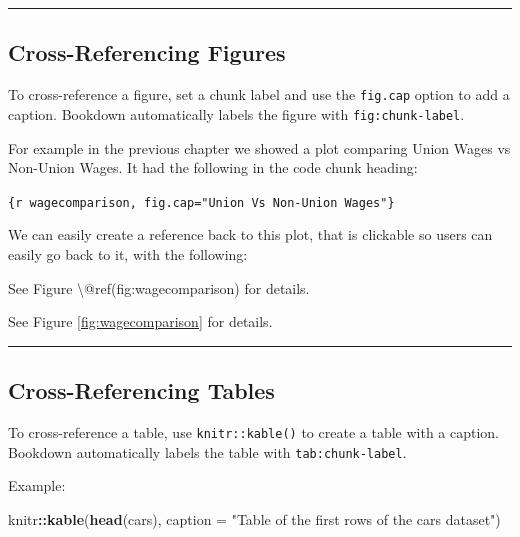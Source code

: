 \documentclass[
]{book}
\newenvironment{Shaded}{\begin{snugshade}}{\end{snugshade}}
\newcommand{\AttributeTok}[1]{\textcolor[rgb]{0.13,0.29,0.53}{#1}}
\newcommand{\FunctionTok}[1]{\textcolor[rgb]{0.13,0.29,0.53}{\textbf{#1}}}
\newcommand{\NormalTok}[1]{#1}
\newcommand{\SpecialCharTok}[1]{\textcolor[rgb]{0.81,0.36,0.00}{\textbf{#1}}}
\newcommand{\StringTok}[1]{\textcolor[rgb]{0.31,0.60,0.02}{#1}}
\theoremstyle{definition}
\theoremstyle{definition}
\theoremstyle{definition}
\theoremstyle{definition}
\theoremstyle{remark}
\begin{document}
\begin{center}\rule{0.5\linewidth}{0.5pt}\end{center}

\subsection{Cross-Referencing Figures}\label{cross-referencing-figures}

To cross-reference a figure, set a chunk label and use the \texttt{fig.cap} option to add a caption. Bookdown automatically labels the figure with \texttt{fig:chunk-label}.

For example in the previous chapter we showed a plot comparing Union Wages vs Non-Union Wages. It had the following in the code chunk heading:

\texttt{\{r\ wagecomparison,\ fig.cap="Union\ Vs\ Non-Union\ Wages"\}}

We can easily create a reference back to this plot, that is clickable so users can easily go back to it, with the following:

\begin{Shaded}
\begin{Highlighting}[]
\NormalTok{See Figure \textbackslash{}@ref(fig:wagecomparison) for details.}
\end{Highlighting}
\end{Shaded}

See Figure \ref{fig:wagecomparison} for details.

\begin{center}\rule{0.5\linewidth}{0.5pt}\end{center}

\subsection{Cross-Referencing Tables}\label{cross-referencing-tables}

To cross-reference a table, use \texttt{knitr::kable()} to create a table with a caption. Bookdown automatically labels the table with \texttt{tab:chunk-label}.

Example:

\begin{Shaded}
\begin{Highlighting}[]
\NormalTok{knitr}\SpecialCharTok{::}\FunctionTok{kable}\NormalTok{(}\FunctionTok{head}\NormalTok{(cars), }\AttributeTok{caption =} \StringTok{"Table of the first rows of the cars dataset"}\NormalTok{)}
\end{Highlighting}
\end{Shaded}
\end{document}
